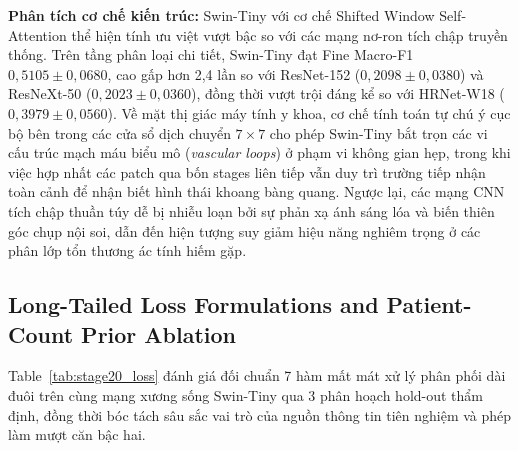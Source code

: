 \documentclass[runningheads]{llncs}
\begin{document}
\noindent \textbf{Phân tích cơ chế kiến trúc:} Swin-Tiny với cơ chế Shifted Window Self-Attention thể hiện tính ưu việt vượt bậc so với các mạng nơ-ron tích chập truyền thống. Trên tầng phân loại chi tiết, Swin-Tiny đạt Fine Macro-F1 $0{,}5105 \pm 0{,}0680$, cao gấp hơn 2,4 lần so với ResNet-152 ($0{,}2098 \pm 0{,}0380$) và ResNeXt-50 ($0{,}2023 \pm 0{,}0360$), đồng thời vượt trội đáng kể so với HRNet-W18 ($0{,}3979 \pm 0{,}0560$). Về mặt thị giác máy tính y khoa, cơ chế tính toán tự chú ý cục bộ bên trong các cửa sổ dịch chuyển $7 \times 7$ cho phép Swin-Tiny bắt trọn các vi cấu trúc mạch máu biểu mô (\textit{vascular loops}) ở phạm vi không gian hẹp, trong khi việc hợp nhất các patch qua bốn stages liên tiếp vẫn duy trì trường tiếp nhận toàn cảnh để nhận biết hình thái khoang bàng quang. Ngược lại, các mạng CNN tích chập thuần túy dễ bị nhiễu loạn bởi sự phản xạ ánh sáng lóa và biến thiên góc chụp nội soi, dẫn đến hiện tượng suy giảm hiệu năng nghiêm trọng ở các phân lớp tổn thương ác tính hiếm gặp.

\subsection{Long-Tailed Loss Formulations and Patient-Count Prior Ablation}
Table~\ref{tab:stage20_loss} đánh giá đối chuẩn 7 hàm mất mát xử lý phân phối dài đuôi trên cùng mạng xương sống Swin-Tiny qua 3 phân hoạch hold-out thẩm định, đồng thời bóc tách sâu sắc vai trò của nguồn thông tin tiên nghiệm và phép làm mượt căn bậc hai.
\end{document}
